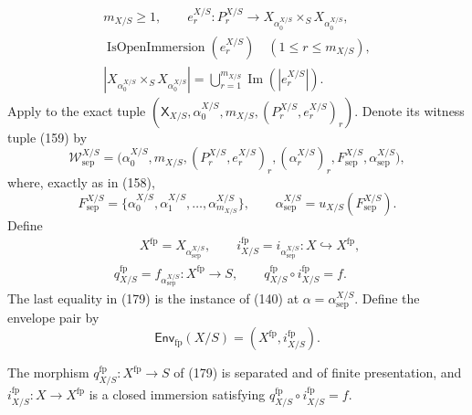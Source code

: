 \begin{definition}
\[\begin{gathered}
    m_{X/S}\geq1,\qquad
    e^{X/S}_r\colon P^{X/S}_r\to
      X_{\alpha^{X/S}_0}\times_SX_{\alpha^{X/S}_0},\\
    \operatorname{IsOpenImmersion}(e^{X/S}_r)
      \quad(1\leq r\leq m_{X/S}),\\
    |X_{\alpha^{X/S}_0}\times_SX_{\alpha^{X/S}_0}|
      =\bigcup_{r=1}^{m_{X/S}}\operatorname{Im}(|e^{X/S}_r|).
  \end{gathered}                                                     \tag{176}
  \]
  Apply  to the exact tuple
  $(\mathsf X_{X/S},\alpha^{X/S}_0,m_{X/S},
    (P^{X/S}_r,e^{X/S}_r)_r)$.  Denote its witness tuple (159) by
  \[
    \mathcal W^{X/S}_{\mathrm{sep}}
      =\bigl(\alpha^{X/S}_0,m_{X/S},
        (P^{X/S}_r,e^{X/S}_r)_r,
        (\alpha^{X/S}_r)_r,F^{X/S}_{\mathrm{sep}},
        \alpha^{X/S}_{\mathrm{sep}}\bigr),                       \tag{177}
  \]
  where, exactly as in (158),
  \[
    F^{X/S}_{\mathrm{sep}}
      =\{\alpha^{X/S}_0,\alpha^{X/S}_1,\ldots,
          \alpha^{X/S}_{m_{X/S}}\},
    \qquad
    \alpha^{X/S}_{\mathrm{sep}}
      =u_{X/S}(F^{X/S}_{\mathrm{sep}}).                          \tag{178}
  \]
  Define
  \[
  \begin{gathered}
    \qquad
    X^{\mathrm{fp}}=X_{\alpha^{X/S}_{\mathrm{sep}}},
    \qquad
    i^{\mathrm{fp}}_{X/S}
      =i_{\alpha^{X/S}_{\mathrm{sep}}}\colon X\hookrightarrow X^{\mathrm{fp}},
    \\
    q^{\mathrm{fp}}_{X/S}
      =f_{\alpha^{X/S}_{\mathrm{sep}}}\colon X^{\mathrm{fp}}\to S,
    \qquad
    q^{\mathrm{fp}}_{X/S}\circ i^{\mathrm{fp}}_{X/S}=f.
  \end{gathered}                                                 \tag{179}
  \]
  The last equality in (179) is the instance of (140) at
  $\alpha=\alpha^{X/S}_{\mathrm{sep}}$.  Define the envelope pair by
  \[
    \mathsf{Env}_{\mathrm{fp}}(X/S)
      =(X^{\mathrm{fp}},i^{\mathrm{fp}}_{X/S}).                  \tag{180}
  \]
\end{definition}

\begin{proposition}
  \label{prop:nagata-finite-type-closed-in-fp}
  \lean{}

  The morphism
  $q^{\mathrm{fp}}_{X/S}\colon X^{\mathrm{fp}}\to S$ of (179) is separated
  and of finite presentation, and
  $i^{\mathrm{fp}}_{X/S}\colon X\to X^{\mathrm{fp}}$ is a closed immersion
  satisfying $q^{\mathrm{fp}}_{X/S}\circ i^{\mathrm{fp}}_{X/S}=f$.
\end{proposition}

